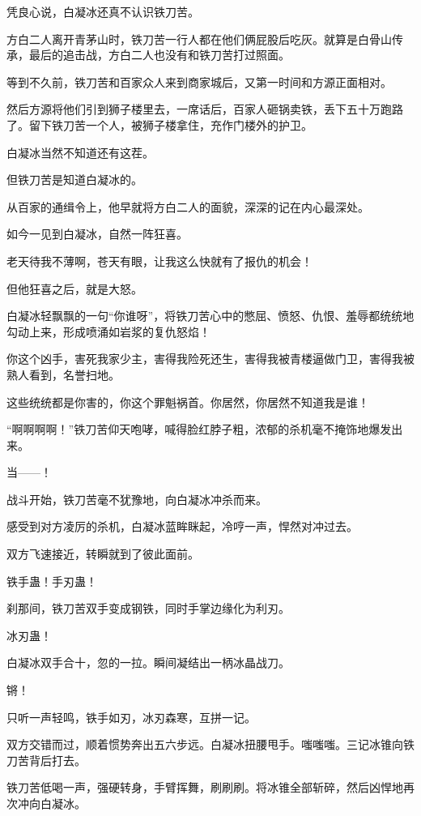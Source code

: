 
\begin{this_body}

凭良心说，白凝冰还真不认识铁刀苦。

方白二人离开青茅山时，铁刀苦一行人都在他们俩屁股后吃灰。就算是白骨山传承，最后的追击战，方白二人也没有和铁刀苦打过照面。

等到不久前，铁刀苦和百家众人来到商家城后，又第一时间和方源正面相对。

然后方源将他们引到狮子楼里去，一席话后，百家人砸锅卖铁，丢下五十万跑路了。留下铁刀苦一个人，被狮子楼拿住，充作门楼外的护卫。

白凝冰当然不知道还有这茬。

但铁刀苦是知道白凝冰的。

从百家的通缉令上，他早就将方白二人的面貌，深深的记在内心最深处。

如今一见到白凝冰，自然一阵狂喜。

老天待我不薄啊，苍天有眼，让我这么快就有了报仇的机会！

但他狂喜之后，就是大怒。

白凝冰轻飘飘的一句“你谁呀”，将铁刀苦心中的憋屈、愤怒、仇恨、羞辱都统统地勾动上来，形成喷涌如岩浆的复仇怒焰！

你这个凶手，害死我家少主，害得我险死还生，害得我被青楼逼做门卫，害得我被熟人看到，名誉扫地。

这些统统都是你害的，你这个罪魁祸首。你居然，你居然不知道我是谁！

“啊啊啊啊！”铁刀苦仰天咆哮，喊得脸红脖子粗，浓郁的杀机毫不掩饰地爆发出来。

当——！

战斗开始，铁刀苦毫不犹豫地，向白凝冰冲杀而来。

感受到对方凌厉的杀机，白凝冰蓝眸眯起，冷哼一声，悍然对冲过去。

双方飞速接近，转瞬就到了彼此面前。

铁手蛊！手刃蛊！

刹那间，铁刀苦双手变成钢铁，同时手掌边缘化为利刃。

冰刃蛊！

白凝冰双手合十，忽的一拉。瞬间凝结出一柄冰晶战刀。

锵！

只听一声轻鸣，铁手如刃，冰刃森寒，互拼一记。

双方交错而过，顺着惯势奔出五六步远。白凝冰扭腰甩手。嗤嗤嗤。三记冰锥向铁刀苦背后打去。

铁刀苦低喝一声，强硬转身，手臂挥舞，刷刷刷。将冰锥全部斩碎，然后凶悍地再次冲向白凝冰。


\end{this_body}
